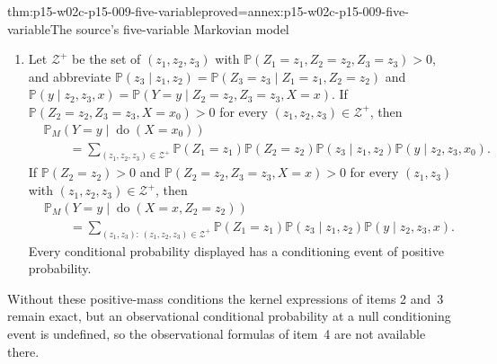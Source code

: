 \begin{hbtheorem}{thm:p15-w02c-p15-009-five-variable}{proved=annex:p15-w02c-p15-009-five-variable}{The source's five-variable Markovian model}
\begin{enumerate}
\[\begin{aligned}
                k_Y(y\mid z_2,z_3,x).
      \end{aligned}
      \]
\item Let \(\mathcal Z^+\) be the set of \((z_1,z_2,z_3)\) with
      \(\mathbb P(Z_1=z_1,Z_2=z_2,Z_3=z_3)>0\), and abbreviate
      \(\mathbb P(z_3\mid z_1,z_2)=
        \mathbb P(Z_3=z_3\mid Z_1=z_1,Z_2=z_2)\) and
      \(\mathbb P(y\mid z_2,z_3,x)=
        \mathbb P(Y=y\mid Z_2=z_2,Z_3=z_3,X=x)\).
      If \(\mathbb P(Z_2=z_2,Z_3=z_3,X=x_0)>0\) for every
      \((z_1,z_2,z_3)\in\mathcal Z^+\), then
      \[
      \begin{aligned}
       &\mathbb P_M(Y=y\mid\operatorname{do}(X=x_0))\\
       &\qquad=\sum_{(z_1,z_2,z_3)\in\mathcal Z^+}\mathbb P(Z_1=z_1)
        \mathbb P(Z_2=z_2)\mathbb P(z_3\mid z_1,z_2)
        \mathbb P(y\mid z_2,z_3,x_0).
      \end{aligned}
      \]
      If \(\mathbb P(Z_2=z_2)>0\) and
      \(\mathbb P(Z_2=z_2,Z_3=z_3,X=x)>0\) for every \((z_1,z_3)\) with
      \((z_1,z_2,z_3)\in\mathcal Z^+\), then
      \[
      \begin{aligned}
       &\mathbb P_M(Y=y\mid\operatorname{do}(X=x,Z_2=z_2))\\
       &\qquad=\sum_{(z_1,z_3):\,(z_1,z_2,z_3)\in\mathcal Z^+}
        \mathbb P(Z_1=z_1)\mathbb P(z_3\mid z_1,z_2)
        \mathbb P(y\mid z_2,z_3,x).
      \end{aligned}
      \]
      Every conditional probability displayed has a conditioning event
      of positive probability.
\end{enumerate}
Without these positive-mass conditions the kernel expressions of items
2 and~3 remain exact, but an observational conditional probability at a
null conditioning event is undefined, so the observational formulas of
item~4 are not available there.
\end{hbtheorem}

